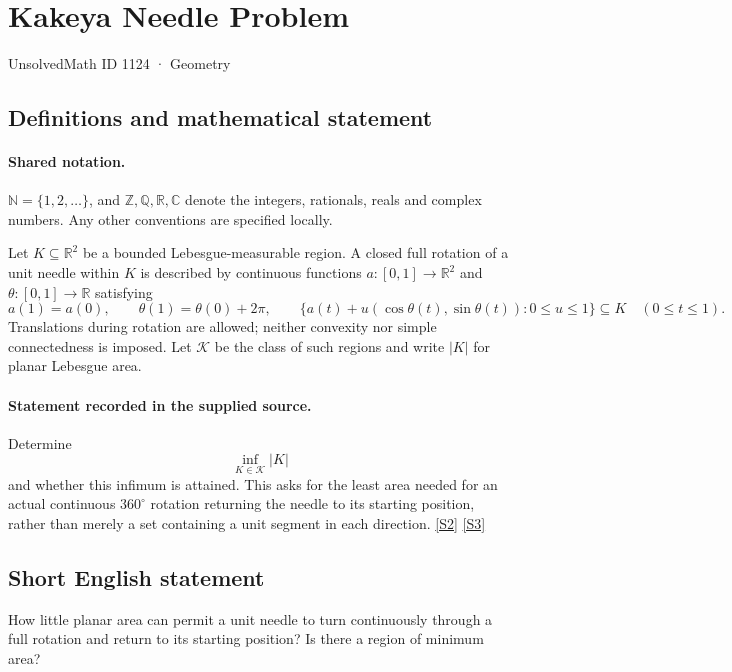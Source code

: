 \documentclass[11pt]{article}
\newcommand{\sref}[2]{\hyperlink{source:#1:#2}{[S#2]}}
\begin{document}
\setcounter{section}{1123}
\section{Kakeya Needle Problem}\label{1124}
{\small\sffamily UnsolvedMath ID 1124 · Geometry}
\subsection{Definitions and mathematical statement}

\paragraph{Shared notation.}$\mathbb N=\{1,2,\ldots\}$, and $\mathbb Z,\mathbb Q,\mathbb R,\mathbb C$ denote the integers, rationals, reals and complex numbers. Any other conventions are specified locally.


Let \(K\subseteq\mathbb R^2\) be a bounded Lebesgue-measurable region.
A closed full rotation of a unit needle within \(K\) is described by
continuous functions \(a:[0,1]\to\mathbb R^2\) and
\(\theta:[0,1]\to\mathbb R\) satisfying
\[
 a(1)=a(0),\qquad \theta(1)=\theta(0)+2\pi,\qquad
 \{a(t)+u(\cos\theta(t),\sin\theta(t)):0\le u\le1\}
       \subseteq K\quad (0\le t\le1).
\]
Translations during rotation are allowed; neither convexity nor simple
connectedness is imposed.  Let \(\mathcal K\) be the class of such regions
and write \(|K|\) for planar Lebesgue area.
\paragraph{Statement recorded in the supplied source.}
Determine
\[
 \inf_{K\in\mathcal K}|K|
\]
and whether this infimum is attained.  This asks for the least area
needed for an actual continuous \(360^\circ\) rotation returning the
needle to its starting position, rather than merely a set containing
a unit segment in each direction. \sref{1124}{2} \sref{1124}{3}
\subsection{Short English statement}
How little planar area can permit a unit needle to turn continuously through a full rotation and return to its starting position? Is there a region of minimum area?
\end{document}
